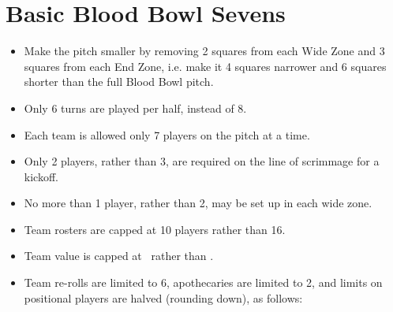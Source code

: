 \section{Basic Blood Bowl Sevens}

\begin{itemize}
\item Make the pitch smaller by removing 2 squares from each Wide Zone and 3 squares from each End Zone, i.e. make it 4 squares narrower and 6 squares shorter than the full Blood Bowl pitch.
\item Only 6 turns are played per half, instead of 8.
\item Each team is allowed only 7 players on the pitch at a time.
\item Only 2 players, rather than 3, are required on the line of scrimmage for a kickoff.
\item No more than 1 player, rather than 2, may be set up in each wide zone.
\item Team rosters are capped at 10 players rather than 16.
\item Team value is capped at \TVsevens\ rather than \TV .
\item Team re-rolls are limited to 6, apothecaries are limited to 2, and limits on positional players are halved (rounding down), as follows:
\end{itemize}

